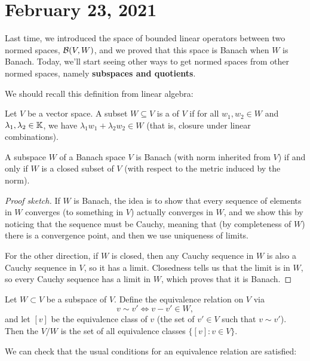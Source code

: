 \pagebreak\section{February 23, 2021}

Last time, we introduced the space of bounded linear operators between two normed spaces, $\mathcal{B}(V, W)$, and we proved that this space is Banach when $W$ is Banach. Today, we'll start seeing other ways to get normed spaces from other normed spaces, namely \textbf{subspaces and quotients}.

We should recall this definition from linear algebra:

\begin{definition}
Let $V$ be a vector space. A subset $W \subseteq V$ is a  of $V$ if for all $w_1, w_2 \in W$ and $\lambda_1, \lambda_2 \in \mathbb K$, we have $\lambda_1 w_1 + \lambda_2 w_2 \in W$ (that is, closure under linear combinations).
\end{definition}

\begin{proposition}
A subspace $W$ of a Banach space $V$ is Banach (with norm inherited from $V$) if and only if $W$ is a closed subset of $V$ (with respect to the metric induced by the norm).
\end{proposition}
\begin{proof}[Proof sketch]
If $W$ is Banach, the idea is to show that every sequence of elements in $W$ converges (to something in $V$) actually converges in $W$, and we show this by noticing that the sequence must be Cauchy, meaning that (by completeness of $W$) there is a convergence point, and then we use uniqueness of limits. 

For the other direction, if $W$ is closed, then any Cauchy sequence in $W$ is also a Cauchy sequence in $V$, so it has a limit. Closedness tells us that the limit is in $W$, so every Cauchy sequence has a limit in $W$, which proves that it is Banach.
\end{proof}

\begin{definition}
Let $W \subset V$ be a subspace of $V$. Define the equivalence relation on $V$ via 
\[
    v \sim v' \iff v - v' \in W,
\]
and let $[v]$ be the equivalence class of $v$ (the set of $v' \in V$ such that $v \sim v'$). Then the  $V/W$ is the set of all equivalence classes $\{[v]: v \in V\}$.
\end{definition}

We can check that the usual conditions for an equivalence relation are satisfied:

